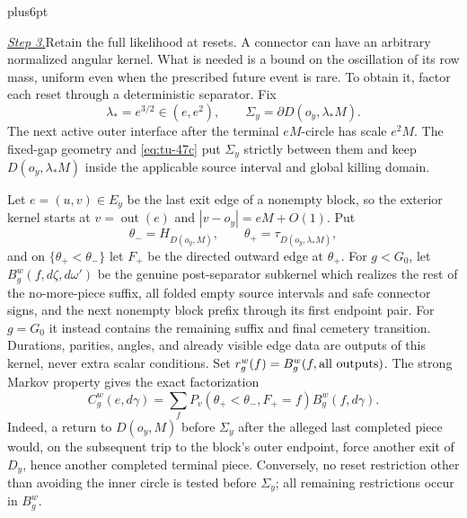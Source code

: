 \documentclass[12pt,reqno]{amsart}
\makeatletter
\theoremstyle{plain}
\theoremstyle{definition}
\theoremstyle{remark}
\renewenvironment{proof}[1][\proofname]{%
  \par
  \pushQED{\qed}%
  \normalfont
  \topsep6pt plus6pt\relax
  \trivlist
  \item[\hskip\labelsep\slshape #1\@addpunct{.}]%
  \ignorespaces
}{%
  \popQED
  \endtrivlist
  \@endpefalse
}
\DeclareRobustCommand{\qed}{%
  \leavevmode\unskip\penalty9999\hbox{}\nobreak
  \ifmmode
    \makebox[0pt][l]{\qquad\hbox{\qedsymbol}}%
  \else
    \qquad\hbox{\qedsymbol}%
  \fi
}
\renewcommand{\qedsymbol}{\rule[.47pt]{4pt}{6pt}}
\numberwithin{equation}{section}
\makeatother
\begin{document}
\begin{proof}[Proof of Lemma~\ref{lem:terminal-feynman-kac}]
\smallskip\noindent
\underline{\textit{Step 3.}}\quad Retain the full likelihood at resets.
A connector can have an arbitrary normalized angular kernel. What is
needed is a bound on the oscillation of its row mass, uniform even when
the prescribed future event is rare. To obtain it, factor each reset
through a deterministic separator. Fix
\begin{equation}
        \lambda_*=e^{3/2}\in(e,e^2),\qquad
        \Sigma_y=\partial D(o_y,\lambda_*M).                \label{eq:tu-59a0}
\end{equation}
The next active outer interface after the terminal \(eM\)-circle has scale
\(e^2M\).  The fixed-gap geometry and \eqref{eq:tu-47c} put \(\Sigma_y\) strictly
between them and keep \(D(o_y,\lambda_*M)\) inside the applicable source
interval and global killing domain.

Let \(e=(u,v)\in E_y\) be the last exit edge of a nonempty block, so the
exterior kernel starts at \(v=\operatorname{out}(e)\) and
\(|v-o_y|=eM+O(1)\).  Put
\[
 \theta_-=H_{D(o_y,M)},\qquad
 \theta_+=\tau_{D(o_y,\lambda_*M)},
\]
and on \(\{\theta_+<\theta_-\}\) let \(F_+\) be the directed outward
edge at \(\theta_+\).  For \(g<G_0\), let
\(B_g^w(f,d\zeta,d\omega')\) be the genuine post-separator subkernel
which realizes the rest of the no-more-piece suffix, all folded empty
source intervals and safe connector signs, and the next nonempty block
prefix through its first endpoint pair.  For \(g=G_0\) it instead contains
the remaining suffix and final cemetery transition.  Durations, parities,
angles, and already visible edge data are outputs of this kernel, never
extra scalar conditions.  Set \(r_g^w(f)=B_g^w(f,\hbox{all outputs})\).
The strong Markov property gives the exact factorization
\begin{equation}
 C_g^w(e,d\gamma)=\sum_f
 P_v(\theta_+<\theta_-,F_+=f)B_g^w(f,d\gamma).              \label{eq:tu-59a1}
\end{equation}
Indeed, a return to \(D(o_y,M)\) before \(\Sigma_y\) after the alleged
last completed piece would, on the subsequent trip to the block's outer
endpoint, force another exit of \(D_y\), hence another completed terminal
piece.  Conversely, no reset restriction other than avoiding the inner
circle is tested before \(\Sigma_y\); all remaining restrictions occur in
\(B_g^w\).


\end{proof}
\end{document}
